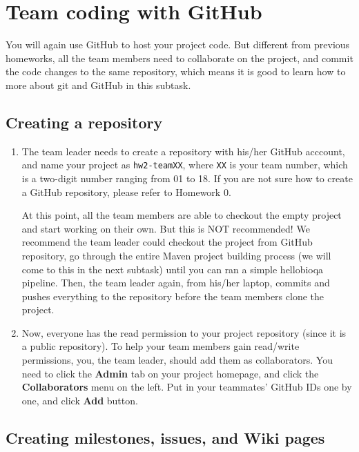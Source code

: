 
\section{Team coding with GitHub}

You will again use GitHub to host your project code. But different from previous
homeworks, all the team members need to collaborate on the project, and commit
the code changes to the same repository, which means it is good to learn how to
more about git and GitHub in this subtask.

\subsection{Creating a repository}

\begin{enumerate}

\item The team leader needs to create a repository with his/her GitHub acccount,
and name your project as \texttt{hw2-teamXX}, where \texttt{XX} is your team
number, which is a two-digit number ranging from 01 to 18. If you are not sure
how to create a GitHub repository, please refer to Homework 0.

At this point, all the team members are able to checkout the empty project and
start working on their own. But this is NOT recommended! We recommend the team
leader could checkout the project from GitHub repository, go through the entire
Maven project building process (we will come to this in the next subtask) until
you can ran a simple hellobioqa pipeline. Then, the team leader again, from
his/her laptop, commits and pushes everything to the repository before the team
members clone the project.

\item Now, everyone has the read permission to your project repository (since it
is a public repository). To help your team members gain read/write permissions,
you, the team leader, should add them as collaborators. You need to click the
\textbf{Admin} tab on your project homepage, and click the
\textbf{Collaborators} menu on the left. Put in your teammates' GitHub IDs one
by one, and click \textbf{Add} button.

\end{enumerate}

\subsection{Creating milestones, issues, and Wiki pages}

